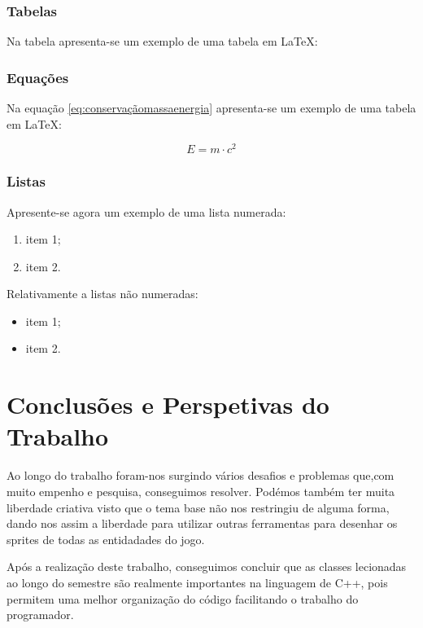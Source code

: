 \documentclass[a4paper,11pt]{article}
\newcommand\tabitem{\setlength{\itemindent}{1cm}}
\newcommand\tab[1][0.8cm]{\hspace*{#1}}
\begin{document}
\subsubsection{Tabelas}

\tab Na tabela apresenta-se um exemplo de uma tabela em \LaTeX:

\subsubsection{Equações}

\tab Na equação \ref{eq:conservaçãomassaenergia} apresenta-se um exemplo de uma tabela em \LaTeX:

\begin{equation}\label{eq:conservaçãomassaenergia}
    E = m \cdot c^{2}
\end{equation}

\subsubsection{Listas}

\tab Apresente-se agora um exemplo de uma lista numerada:

\begin{enumerate}
    \tabitem
    \item item 1;
    \item item 2.
\end{enumerate}

Relativamente a listas não numeradas:

\begin{itemize}
    \tabitem
    \item item 1;
    \item item 2.
\end{itemize}

\pagebreak


\section{Conclusões e Perspetivas do Trabalho}

\tab Ao longo do trabalho foram-nos surgindo vários desafios e problemas que,com muito empenho e pesquisa, conseguimos resolver. Podémos também ter muita liberdade criativa visto que o tema base não nos restringiu de alguma forma, dando nos assim a liberdade para utilizar outras ferramentas para desenhar os sprites de todas as entidadades do jogo. \tab
    
Após a realização deste trabalho, conseguimos concluir que as classes lecionadas ao longo do semestre são realmente importantes na linguagem de C++, pois permitem uma melhor organização do código facilitando o trabalho do programador.\tab 
\end{document}
